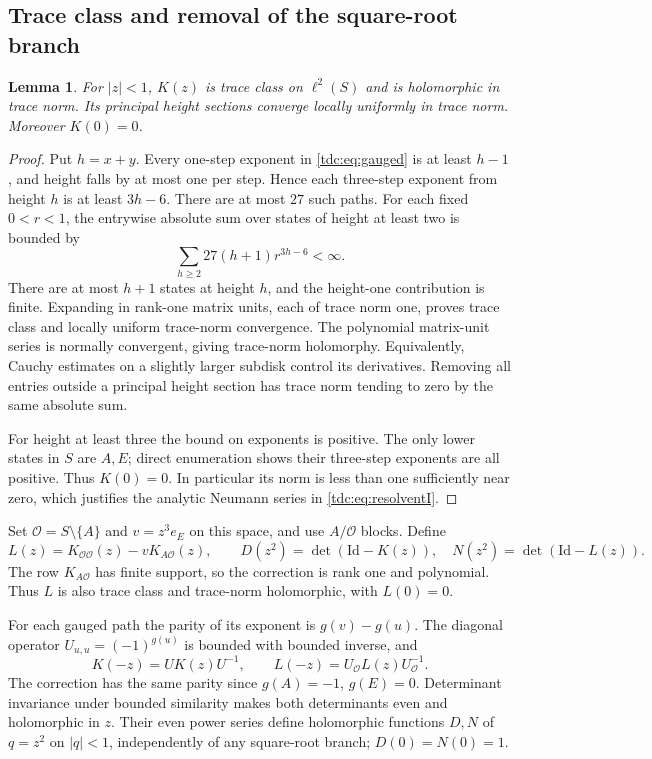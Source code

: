 \documentclass[11pt]{article}
\newtheorem{lemma}[theorem]{Lemma}
\theoremstyle{definition}\newtheorem{definition}[theorem]{Definition}
\theoremstyle{remark}\newtheorem{remark}[theorem]{Remark}
\newcommand{\Id}{\mathrm{Id}}
\newcommand{\OO}{\mathcal O}
\begin{document}
\subsection{Trace class and removal of the square-root branch}
\begin{lemma}\label{tdc:lem:trace}
For $|z|<1$, $K(z)$ is trace class on $\ell^2(S)$ and is holomorphic in trace norm. Its principal height sections converge locally uniformly in trace norm. Moreover $K(0)=0$.
\end{lemma}
\begin{proof}
Put $h=x+y$. Every one-step exponent in \eqref{tdc:eq:gauged} is at least $h-1$, and height falls by at most one per step. Hence each three-step exponent from height $h$ is at least $3h-6$. There are at most $27$ such paths. For each fixed $0<r<1$, the entrywise absolute sum over states of height at least two is bounded by
\begin{equation}\label{tdc:eq:nuclear}
 \sum_{h\ge2}27(h+1)r^{3h-6}<\infty.
\end{equation}
There are at most $h+1$ states at height $h$, and the height-one contribution is finite. Expanding in rank-one matrix units, each of trace norm one, proves trace class and locally uniform trace-norm convergence. The polynomial matrix-unit series is normally convergent, giving trace-norm holomorphy. Equivalently, Cauchy estimates on a slightly larger subdisk control its derivatives. Removing all entries outside a principal height section has trace norm tending to zero by the same absolute sum.

For height at least three the bound on exponents is positive. The only lower states in $S$ are $A,E$; direct enumeration shows their three-step exponents are all positive. Thus $K(0)=0$. In particular its norm is less than one sufficiently near zero, which justifies the analytic Neumann series in \eqref{tdc:eq:resolventI}.
\end{proof}

Set $\OO=S\setminus\{A\}$ and $v=z^3e_E$ on this space, and use $A/\OO$ blocks. Define
\begin{equation}\label{tdc:eq:Landdet}
 L(z)=K_{\OO\OO}(z)-vK_{A\OO}(z),\qquad
 D(z^2)=\det(\Id-K(z)),\quad N(z^2)=\det(\Id-L(z)).
\end{equation}
The row $K_{A\OO}$ has finite support, so the correction is rank one and polynomial. Thus $L$ is also trace class and trace-norm holomorphic, with $L(0)=0$.

For each gauged path the parity of its exponent is $g(v)-g(u)$. The diagonal operator $U_{u,u}=(-1)^{g(u)}$ is bounded with bounded inverse, and
\[
 K(-z)=UK(z)U^{-1},\qquad L(-z)=U_{\OO}L(z)U_{\OO}^{-1}.
\]
The correction has the same parity since $g(A)=-1$, $g(E)=0$. Determinant invariance under bounded similarity makes both determinants even and holomorphic in $z$. Their even power series define holomorphic functions $D,N$ of $q=z^2$ on $|q|<1$, independently of any square-root branch; $D(0)=N(0)=1$.
\end{document}
